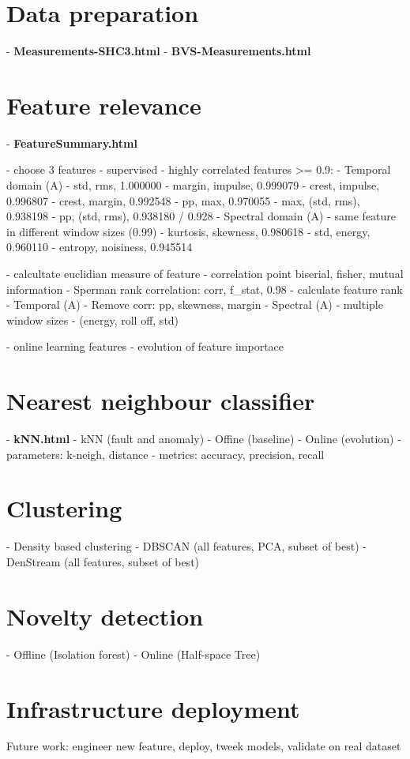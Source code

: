 \section{Data preparation}


- \textbf{Measurements-SHC3.html}
- \textbf{BVS-Measurements.html}

\section{Feature relevance}
- \textbf{FeatureSummary.html}

- choose 3 features
- supervised
	- highly correlated features >= 0.9:
		- Temporal domain (A)
			- std, rms, 1.000000
			- margin, impulse, 0.999079
			- crest, impulse, 0.996807
			- crest, margin,	0.992548
			- pp, max, 0.970055
			- max, (std, rms), 0.938198
			- pp, (std, rms), 0.938180 / 0.928
		- Spectral domain (A)
			- same feature in different window sizes (0.99)
			- kurtosis, skewness, 0.980618
			- std, energy, 0.960110
			- entropy, noisiness, 0.945514

	- calcultate euclidian measure of feature 
	- correlation point biserial, fisher, mutual information
		- Sperman rank correlation: corr, f\_stat, 0.98
	- calculate feature rank
		- Temporal (A) - Remove corr: pp, skewness, margin
		- Spectral (A) - multiple window sizes 
			- (energy, roll off, std) 

- online learning features
	- evolution of feature importace

\section{Nearest neighbour classifier}
- \textbf{kNN.html}
- kNN (fault and anomaly)
	- Offine (baseline)
	- Online (evolution)
- parameters: k-neigh, distance
- metrics: accuracy, precision, recall

\section{Clustering}
- Density based clustering
	- DBSCAN (all features, PCA, subset of best)
	- DenStream (all features, subset of best)

\section{Novelty detection}
- Offline (Isolation forest)
- Online (Half-space Tree)


\section{Infrastructure deployment}
Future work: engineer new feature, deploy, tweek models, validate on real dataset

